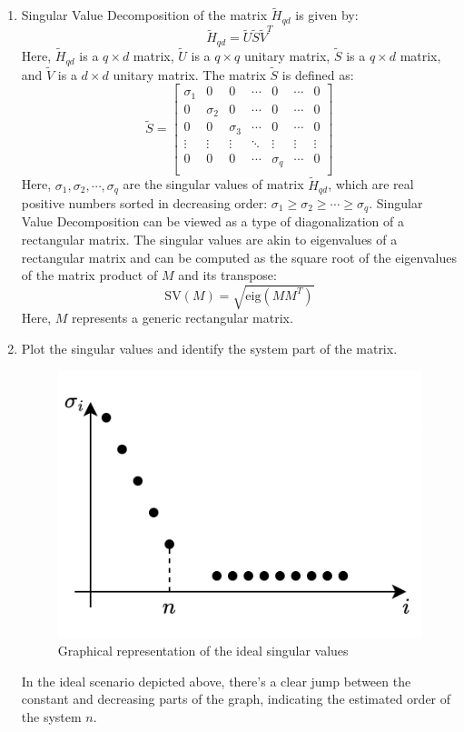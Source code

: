 \begin{enumerate}
    \item Singular Value Decomposition of the matrix $\tilde{H}_{qd}$ is given by:
        \[\tilde{H}_{qd}=\tilde{U}\tilde{S}\tilde{V}^T\]
        Here, $\tilde{H}_{qd}$ is a $q \times d$ matrix, $\tilde{U}$ is a $q \times q$ unitary matrix, $\tilde{S}$ is a $q \times d$ matrix, and $\tilde{V}$ is a $d \times d$ unitary matrix. 
        The matrix $\tilde{S}$ is defined as: 
        \[\tilde{S}=\begin{bmatrix}
            \sigma_1 & 0 & 0 & \cdots & 0 & \cdots & 0\\ 
            0 & \sigma_2 & 0 & \cdots & 0 & \cdots & 0\\ 
            0 & 0 & \sigma_3 & \cdots & 0 & \cdots & 0\\ 
            \vdots & \vdots  & \vdots  & \ddots  & \vdots  & \vdots & \vdots\\ 
            0 & 0 & 0 & \cdots & \sigma_q & \cdots & 0\\ 
        \end{bmatrix}\]
        Here, $\sigma_1,\sigma_2,\cdots,\sigma_q$ are the singular values of matrix $\tilde{H}_{qd}$, which are real positive numbers sorted in decreasing order: $\sigma_1\geq\sigma_2\geq\cdots\geq\sigma_q$. 
        Singular Value Decomposition can be viewed as a type of diagonalization of a rectangular matrix. 
        The singular values are akin to eigenvalues of a rectangular matrix and can be computed as the square root of the eigenvalues of the matrix product of $M$ and its transpose:
        \[\text{SV}(M)=\sqrt{\text{eig}(MM^T)}\]
        Here, $M$ represents a generic rectangular matrix.
    \item Plot the singular values and identify the system part of the matrix. 
        \begin{figure}[H]
            \centering
            \includegraphics[width=0.4\linewidth]{images/qd1.png}
            \caption{Graphical representation of the ideal singular values}
        \end{figure}
        In the ideal scenario depicted above, there's a clear jump between the constant and decreasing parts of the graph, indicating the estimated order of the system $n$.

\end{enumerate}
